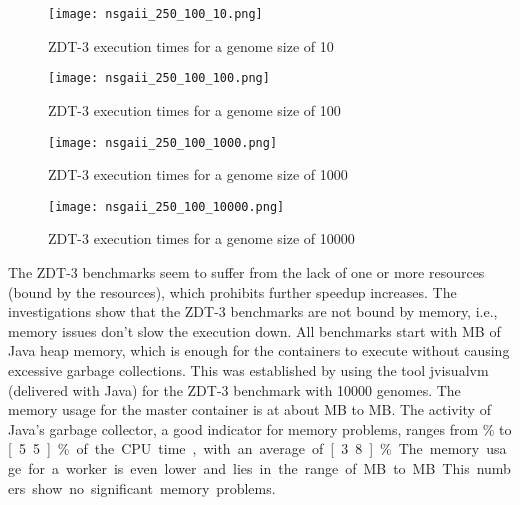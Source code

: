 \begin{figure}
  \centering
  \texttt{[image: nsgaii\_250\_100\_10.png]}
  \caption[ZDT-3 execution times for a genome size of 10]{ZDT-3 execution times for a genome size of 10}
  \label{fig:nsga_250_100_10}
\end{figure}
\begin{figure}
  \centering
  \texttt{[image: nsgaii\_250\_100\_100.png]}
  \caption[ZDT-3 execution times for a genome size of 100]{ZDT-3 execution times for a genome size of 100}
  \label{fig:nsga_250_100_100}
\end{figure}
\begin{figure}
  \centering
  \texttt{[image: nsgaii\_250\_100\_1000.png]}
  \caption[ZDT-3 execution times for a genome size of 1000]{ZDT-3 execution times for a genome size of 1000}
  \label{fig:nsga_250_100_1000}
\end{figure}
\begin{figure}
  \centering
  \texttt{[image: nsgaii\_250\_100\_10000.png]}
  \caption[ZDT-3 execution times for a genome size of 10000]{ZDT-3 execution times for a genome size of 10000}
  \label{fig:nsga_250_100_10000}
\end{figure}

The ZDT-3 benchmarks seem to suffer from the lack of one or more resources (bound by the resources), which prohibits further speedup increases. The investigations show that the ZDT-3 benchmarks are not bound by memory, i.e., memory issues don't slow the execution down. All benchmarks start with \unit[256]{MB} of Java heap memory, which is enough for the containers to execute without causing excessive garbage collections. This was established by using the tool jvisualvm (delivered with Java) for the ZDT-3 benchmark with 10000 genomes. The memory usage for the master container is at about \unit[100]{MB} to \unit[150]{MB}. The activity of Java's garbage collector, a good indicator for memory problems, ranges from \unit[3]{\%} to \unit[5.5]{\%} of the CPU time, with an average of \unit[3.8]{\%}. The memory usage for a worker is even lower and lies in the range of \unit[5]{MB} to \unit[30]{MB}. This numbers show no significant memory problems.

